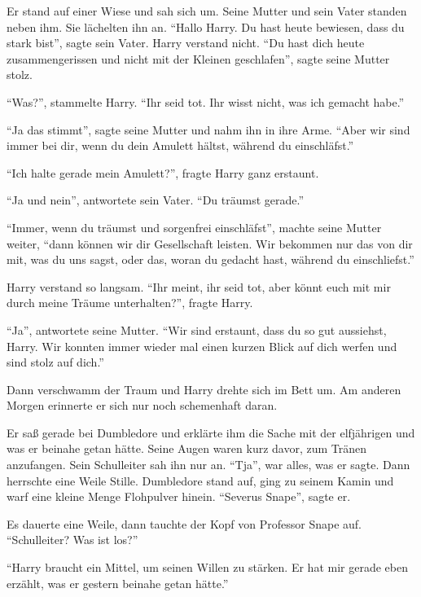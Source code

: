\begin{traum}
Er stand auf einer Wiese und sah sich um. Seine Mutter und sein Vater standen neben ihm. Sie lächelten ihn an. \enquote{Hallo Harry. Du hast heute bewiesen, dass du stark bist}, sagte sein Vater. Harry verstand nicht. \enquote{Du hast dich heute zusammengerissen und nicht mit der Kleinen geschlafen}, sagte seine Mutter stolz.

\enquote{Was?}, stammelte Harry. \enquote{Ihr seid tot. Ihr wisst nicht, was ich gemacht habe.}

\enquote{Ja das stimmt}, sagte seine Mutter und nahm ihn in ihre Arme. \enquote{Aber wir sind immer bei dir, wenn du dein Amulett hältst, während du einschläfst.}

\enquote{Ich halte gerade mein Amulett?}, fragte Harry ganz erstaunt.

\enquote{Ja und nein}, antwortete sein Vater. \enquote{Du träumst gerade.}

\enquote{Immer, wenn du träumst und sorgenfrei einschläfst}, machte seine Mutter weiter, \enquote{dann können wir dir Gesellschaft leisten. Wir bekommen nur das von dir mit, was du uns sagst, oder das, woran du gedacht hast, während du einschliefst.}

Harry verstand so langsam. \enquote{Ihr meint, ihr seid tot, aber könnt euch mit mir durch meine Träume unterhalten?}, fragte Harry.

\enquote{Ja}, antwortete seine Mutter. \enquote{Wir sind erstaunt, dass du so gut aussiehst, Harry. Wir konnten immer wieder mal einen kurzen Blick auf dich werfen und sind stolz auf dich.}
\end{traum}

Dann verschwamm der Traum und Harry drehte sich im Bett um. Am anderen Morgen erinnerte er sich nur noch schemenhaft daran.

Er saß gerade bei Dumbledore und erklärte ihm die Sache mit der elfjährigen und was er beinahe getan hätte. Seine Augen waren kurz davor, zum Tränen anzufangen. Sein Schulleiter sah ihn nur an. \enquote{Tja}, war alles, was er sagte. Dann herrschte eine Weile Stille. Dumbledore stand auf, ging zu seinem Kamin und warf eine kleine Menge Flohpulver hinein. \enquote{Severus Snape}, sagte er.

Es dauerte eine Weile, dann tauchte der Kopf von Professor Snape auf. \enquote{Schulleiter? Was ist los?}

\enquote{Harry braucht ein Mittel, um seinen Willen zu stärken. Er hat mir gerade eben erzählt, was er gestern beinahe getan hätte.}

